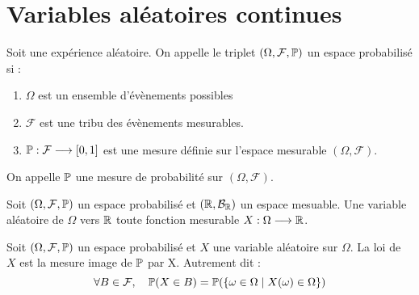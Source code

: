 
\section{Variables aléatoires continues}

\begin{definition}
    Soit une expérience aléatoire. On appelle le triplet $(\Omega, \mathcal{F}, \mathbb{P})$ un espace probabilisé si :
    \begin{enumerate}[label=\roman*)]
        \item $\Omega$ est un ensemble d'évènements possibles 
        \item $ \mathcal{F}$ est une tribu des évènements mesurables. 
        \item $\mathbb{P} : \mathcal{F} \longrightarrow [0,1]$ est une mesure définie sur l'espace mesurable $(\Omega, \mathcal{F})$. 
    \end{enumerate}
    On appelle $\mathbb{P}$ une mesure de probabilité sur $(\Omega, \mathcal{F})$. 
\end{definition}

\begin{definition}
    Soit $(\Omega, \mathcal{F}, \mathbb{P})$ un espace probabilisé et $(\mathbb{R}, \mathcal{B}_{\mathbb{R}})$ un espace mesuable. 
    Une variable aléatoire de $\Omega$ vers $\mathbb{R}$ toute fonction mesurable $X : \Omega \longrightarrow \mathbb{R}$.  
\end{definition}

\begin{definition}
    Soit $(\Omega, \mathcal{F},\mathbb{P})$ un espace probabilisé et $X$ une variable aléatoire sur $\Omega$. 
    La loi de $X$ est la mesure image de $ \mathbb{P}$ par X. Autrement dit :
        \[ \forall B \in \mathcal{F}, \quad \mathbb{P}(X \in B) = \mathbb{P}( \{ \omega \in \Omega \; | \; X(\omega) \in \Omega \} ) \] 
    
\end{definition}




















